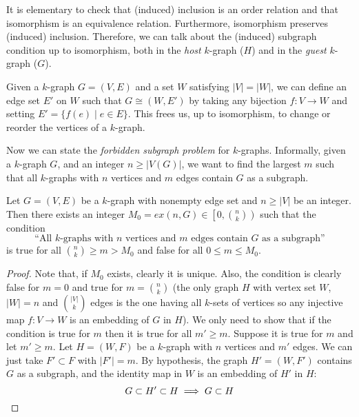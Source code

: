 \begin{remark} %

    It is elementary to check that
    (induced) inclusion is an order relation and that
    isomorphism is an equivalence relation.
    Furthermore, isomorphism preserves (induced) inclusion.
    Therefore, we can talk about the (induced) subgraph
    condition up to isomorphism, both in the \emph{host} $k$-graph
    ($H$) and in the \emph{guest} $k$-graph ($G$).
\end{remark}

\begin{remark} \label{rem:change_vertices}
    Given a $k$-graph $G = (V, E)$ and a set $W$ satisfying $|V| = |W|$,
    we can define an edge set $E'$ on $W$ such that $G \cong (W, E')$
    by taking any bijection $f: V \to W$ and setting $E' = \{f(e) \mid e \in E\}$.
    This frees us, up to isomorphism, to change or reorder
    the vertices of a $k$-graph.
\end{remark}

Now we can state the \emph{forbidden subgraph problem} for $k$-graphs.
Informally, given a $k$-graph $G$, and an integer $n \geq |V(G)|$,
we want to find the largest $m$ such that all $k$-graphs with $n$ vertices and $m$ edges
contain $G$ as a subgraph.

\begin{proposition} \label{prop:extremal}
    Let $G = (V, E)$ be a $k$-graph with nonempty edge set and $n \geq |V|$ be an integer.
    Then there exists an integer $M_0 = ex(n, G) \in \left[ 0, \binom{n}{k}\right)$ such that
    the condition
    \[
        \text{``All $k$-graphs with $n$ vertices and $m$ edges contain $G$ as a subgraph''}
    \]
    is true for all $\binom{n}{k} \geq m > M_0$ and false for all $0 \leq m \leq M_0$.

    \begin{proof}
        Note that, if $M_0$ exists, clearly it is unique.
        Also, the condition is clearly false for $m = 0$ and
        true for $m = \binom{n}{k}$
        (the only graph $H$ with vertex set $W$, $|W|=n$ and $\binom{|V|}{k}$ edges
        is the one having all $k$-sets of vertices so any injective map $f: V \to W$
        is an embedding of $G$ in $H$).
        We only need to show that if the condition is true for $m$ then it is true for
        all $m' \geq m$.
        Suppose it is true for $m$ and let $m' \geq m$.
        Let $H = (W, F)$ be a $k$-graph with $n$ vertices and $m'$ edges.
        We can just take $F' \subset F$ with $|F'| = m$.
        By hypothesis, the graph $H' = (W, F')$ contains $G$ as a subgraph,
        and the identity map in $W$ is an embedding of $H'$ in $H$:
        \[
            G \subset H' \subset H \implies G \subset H \qedhere
        \]
    \end{proof}

\end{proposition}

